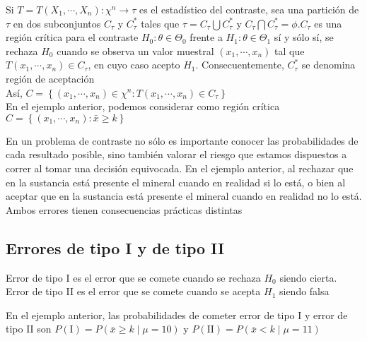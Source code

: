 Si $T=T\left(X_{1}, \cdots, X_{n}\right): \chi^{n} \rightarrow \tau$ es el estadístico del contraste, sea una partición de $\tau$ en dos subconjuntos $C_{\tau}$ y $C_{\tau}^{*}$ tales que $\tau=C_{\tau} \bigcup C_{\tau}^{*}$ y $C_{\tau} \bigcap C_{\tau}^{*}=\phi . C_{\tau}$ es una región crítica para el contraste $H_{0}: \theta \in \Theta_{0}$ frente a $H_{1}: \theta \in \Theta_{1}$ sí y sólo sí, se rechaza $H_{0}$ cuando se observa un valor muestral $\left(x_{1}, \cdots, x_{n}\right)$ tal que $T\left(x_{1}, \cdots, x_{n}\right) \in C_{\tau}$, en cuyo caso acepto $H_{1}$. Consecuentemente, $C_{\tau}^{*}$ se denomina región de aceptación\\
Así, $C=\left\{\left(x_{1}, \cdots, x_{n}\right) \in \chi^{n}: T\left(x_{1}, \cdots, x_{n}\right) \in C_{\tau}\right\}$\\
En el ejemplo anterior, podemos considerar como región crítica $C=\left\{\left(x_{1}, \cdots, x_{n}\right): \bar{x} \geq k\right\}$

En un problema de contraste no sólo es importante conocer las probabilidades de cada resultado posible, sino también valorar el riesgo que estamos dispuestos a correr al tomar una decisión equivocada. En el ejemplo anterior, al rechazar que en la sustancia está presente el mineral cuando en realidad si lo está, o bien al aceptar que en la sustancia está presente el mineral cuando en realidad no lo está. Ambos errores tienen consecuencias prácticas distintas

\subsection{Errores de tipo I y de tipo II}
Error de tipo I es el error que se comete cuando se rechaza $H_{0}$ siendo cierta. Error de tipo II es el error que se comete cuando se acepta $H_{1}$ siendo falsa

En el ejemplo anterior, las probabilidades de cometer error de tipo I y error de tipo II son $P(\mathrm{I})=P(\bar{x} \geq k \mid \mu=10)$ y $P(\mathrm{II})=P(\bar{x}<k \mid \mu=11)$
